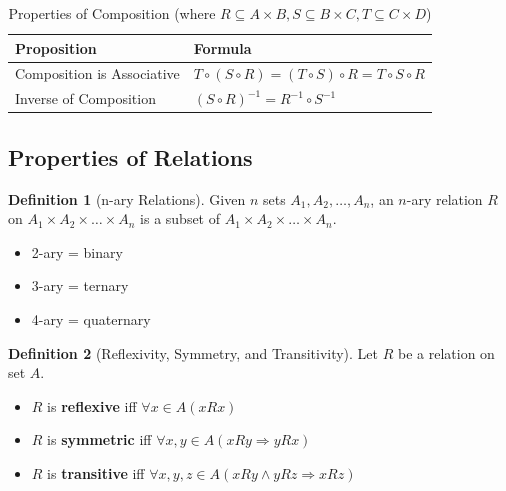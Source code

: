 \documentclass{article}
\theoremstyle{plain}
\theoremstyle{definition}
\newtheorem*{definition}{Definition}
\theoremstyle{remark}
\begin{document}
\begin{table}[h]
    \centering
    \begin{tabular}{ll}
        \toprule
        \textbf{Proposition} & \textbf{Formula} \\
        \midrule
        Composition is Associative & $T \circ (S \circ R) = (T \circ S) \circ R = T \circ S \circ R$ \\
        Inverse of Composition & $(S \circ R)^{-1} = R^{-1} \circ S^{-1}$ \\
        \bottomrule
    \end{tabular}
    \caption{Properties of Composition (where $R \subseteq A \times B, S \subseteq B \times C, T \subseteq C \times D$)}
\end{table}

\subsection{Properties of Relations}

\begin{definition}[n-ary Relations]
    Given $n$ sets $A_1, A_2, \dots, A_n$, an $n$-ary relation $R$ on $A_1 \times A_2 \times \dots \times A_n$ is a subset of $A_1 \times A_2 \times \dots \times A_n$.
    \begin{itemize}
        \item 2-ary = binary
        \item 3-ary = ternary
        \item 4-ary = quaternary
    \end{itemize}
\end{definition}

\begin{definition}[Reflexivity, Symmetry, and Transitivity]
    Let $R$ be a relation on set $A$.
    \begin{itemize}
        \item $R$ is \textbf{reflexive} iff $\forall x \in A (xRx)$
        \item $R$ is \textbf{symmetric} iff $\forall x, y \in A (xRy \Rightarrow yRx)$
        \item $R$ is \textbf{transitive} iff $\forall x, y, z \in A (xRy \wedge yRz \Rightarrow xRz)$
    \end{itemize}
\end{definition}
\end{document}
